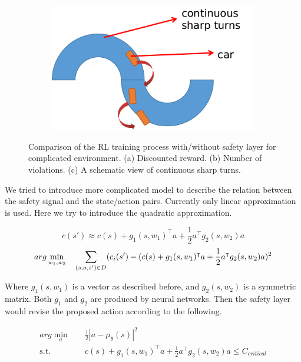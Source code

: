 \documentclass{article} %
\begin{document}
\begin{figure}[ht]
\begin{subfigure}[b]{0.45\textwidth}
\centering
\includegraphics[width=\textwidth]{fig7c_sharp_turns.png}
\caption{}
\label{fig:gull}
\end{subfigure}%
\caption{Comparison of the RL training process with/without safety layer for complicated environment. (a) Discounted reward. (b) Number of violations. (c) A schematic view of continuous sharp turns.}
\end{figure}

We tried to introduce more complicated model to describe the relation between the safety signal and the state/action pairs. Currently only linear approximation is used. Here we try to introduce the quadratic approximation.

$$c(s') \approx c(s) + g_1(s, w_1)^\intercal a + \frac{1}{2} a^\intercal g_2(s, w_2) a$$
\begin{equation}
arg \min_{w_1, w_2} \quad \sum_{(s, a, s')\in D} (c_i(s') - (c(s) + g_1(s, w_1)^\intercal a + \frac{1}{2} a^\intercal g_2(s, w_2) a)^2\\
\end{equation}

Where $g_1(s, w_1)$ is a vector as described before, and $g_2(s,w_2)$ is a symmetric matrix. Both $g_1$ and $g_2$ are produced by neural networks. Then the safety layer would revise the proposed action according to the following.

\begin{equation}
\begin{aligned}
arg \min_{a} \quad & \frac{1}{2} |a - \mu_{\theta}(s)|^2\\
\textrm{s.t.} \quad & c(s) + g_1(s, w_1)^\intercal a + \frac{1}{2} a^\intercal g_2(s, w_2) a \leq C_{critical}\\
\end{aligned}
\end{equation} 
\end{document}

